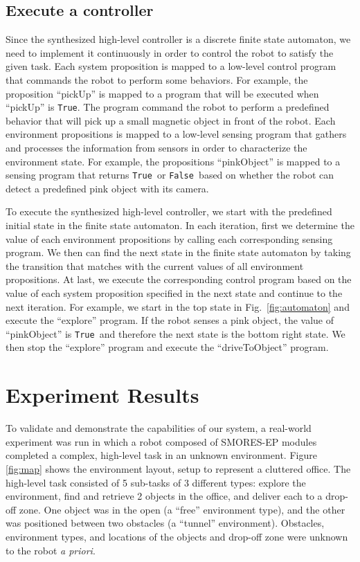\documentclass[conference]{IEEEtran}
\newcommand{\lt}{{\tt True }}
\newcommand{\lf}{{\tt False }}
\newcommand{\ltnsp}{{\tt True}}
\begin{document}
\subsection{Execute a controller}
Since the synthesized high-level controller is a discrete finite state automaton, we need to implement it continuously in order to control the robot to satisfy the given task. 
Each system proposition is mapped to a low-level control program that commands the robot to perform some behaviors.
For example, the proposition ``pickUp'' is mapped to a program that will be executed when ``pickUp'' is \ltnsp. The program command the robot to perform a predefined behavior that will pick up a small magnetic object in front of the robot.
Each environment propositions is mapped to a low-level sensing program that gathers and processes the information from sensors in order to characterize the environment state.
For example, the propositions ``pinkObject'' is mapped to a sensing program that returns \lt or \lf based on whether the robot can detect a predefined pink object with its camera.

To execute the synthesized high-level controller, we start with the predefined initial state in the finite state automaton.
In each iteration, first we determine the value of each environment propositions by calling each corresponding sensing program.
We then can find the next state in the finite state automaton by taking the transition that matches with the current values of all environment propositions.
At last, we execute the corresponding control program based on the value of each system proposition specified in the next state and continue to the next iteration.
For example, we start in the top state in Fig.~\ref{fig:automaton} and execute the ``explore'' program.
If the robot senses a pink object, the value of ``pinkObject'' is \lt and therefore the next state is the bottom right state. We then stop the ``explore'' program and execute the ``driveToObject'' program.

\section{Experiment Results}
\label{sec:experiments}
%
To validate and demonstrate the capabilities of our system, a real-world experiment was run in which a robot composed of SMORES-EP modules completed a complex, high-level task in an unknown environment. Figure \ref{fig:map} shows the environment layout, setup to represent a cluttered office. The high-level task consisted of 5 sub-tasks of 3 different types: explore the environment, find and retrieve 2 objects in the office, and deliver each to a drop-off zone. One object was in the open (a ``free'' environment type), and the other was positioned between two obstacles (a ``tunnel'' environment). Obstacles, environment types, and locations of the objects and drop-off zone were unknown to the robot \textit{a priori}.
\end{document}
